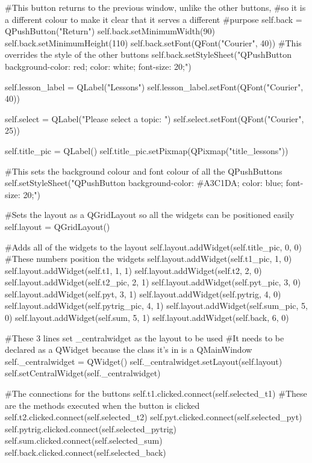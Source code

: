 \begin{landscape}
\begin{python}
        #This button returns to the previous window, unlike the other buttons,
        #so it is a different colour to make it clear that it serves a different
        #purpose
        self.back = QPushButton("Return")
        self.back.setMinimumWidth(90)
        self.back.setMinimumHeight(110)
        self.back.setFont(QFont("Courier", 40))
        #This overrides the style of the other buttons
        self.back.setStyleSheet("QPushButton {background-color: red; color: white; font-size: 20;}")
    
        self.lesson_label = QLabel("Lessons")
        self.lesson_label.setFont(QFont("Courier", 40))
        
        self.select = QLabel("Please select a topic: ")
        self.select.setFont(QFont("Courier", 25))
        
        self.title_pic = QLabel()
        self.title_pic.setPixmap(QPixmap("title_lessons"))

        #This sets the background colour and font colour of all the QPushButtons
        self.setStyleSheet("QPushButton {background-color: #A3C1DA; color: blue; font-size: 20;}")

        #Sets the layout as a QGridLayout so all the widgets can be positioned easily
        self.layout = QGridLayout()

        #Adds all of the widgets to the layout
        self.layout.addWidget(self.title_pic, 0, 0) #These numbers position the widgets
        self.layout.addWidget(self.t1_pic, 1, 0)
        self.layout.addWidget(self.t1, 1, 1)
        self.layout.addWidget(self.t2, 2, 0)
        self.layout.addWidget(self.t2_pic, 2, 1)
        self.layout.addWidget(self.pyt_pic, 3, 0)
        self.layout.addWidget(self.pyt, 3, 1)
        self.layout.addWidget(self.pytrig, 4, 0)
        self.layout.addWidget(self.pytrig_pic, 4, 1)
        self.layout.addWidget(self.sum_pic, 5, 0)
        self.layout.addWidget(self.sum, 5, 1)
        self.layout.addWidget(self.back, 6, 0)

        #These 3 lines set _centralwidget as the layout to be used
        #It needs to be declared as a QWidget because the class it's in is a QMainWindow
        self._centralwidget = QWidget()
        self._centralwidget.setLayout(self.layout)
        self.setCentralWidget(self._centralwidget)

        #The connections for the buttons
        self.t1.clicked.connect(self.selected_t1) #These are the methods executed when the button is clicked
        self.t2.clicked.connect(self.selected_t2)
        self.pyt.clicked.connect(self.selected_pyt)
        self.pytrig.clicked.connect(self.selected_pytrig)
        self.sum.clicked.connect(self.selected_sum)
        self.back.clicked.connect(self.selected_back)


\end{python}
\end{landscape}
